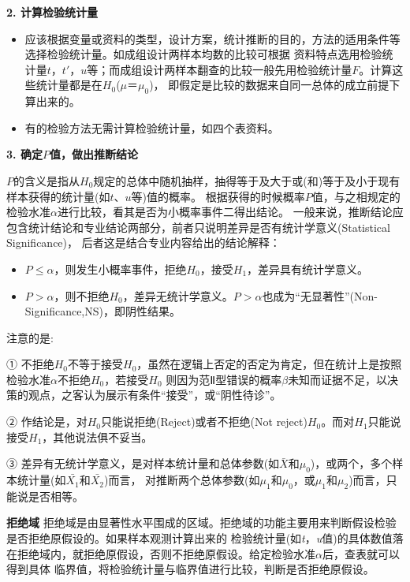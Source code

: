 \documentclass[
]{article}
\begin{document}
\textbf{2. 计算检验统计量}

\begin{itemize}
\item
  应该根据变量或资料的类型，设计方案，统计推断的目的，方法的适用条件等选择检验统计量。如成组设计两样本均数的比较可根据
  资料特点选用检验统计量\(t，t'，u\)等；而成组设计两样本翻查的比较一般先用检验统计量\(F\)。计算这些统计量都是在\(H_0\)(\(μ＝μ_0\))，
  即假定是比较的数据来自同一总体的成立前提下算出来的。
\item
  有的检验方法无需计算检验统计量，如四个表资料。
\end{itemize}

\textbf{3. 确定\(P\)值，做出推断结论}

\(P\)的含义是指从\(H_0\)规定的总体中随机抽样，抽得等于及大于或(和)等于及小于现有样本获得的统计量(如\(t\)、\(u\)等)值的概率。
根据获得的时候概率\(P\)值，与之相规定的检验水准\(\alpha\)进行比较，看其是否为小概率事件二得出结论。
一般来说，推断结论应包含统计结论和专业结论两部分，前者只说明差异是否有统计学意义(Statistical Significance)，
后者这是结合专业内容给出的结论解释：

\begin{itemize}
\item
  \(P\leq\alpha\)，则发生小概率事件，拒绝\(H_0\)，接受\(H_1\)，差异具有统计学意义。
\item
  \(P>\alpha\)，则不拒绝\(H_0\)，差异无统计学意义。\(P>\alpha\)也成为``无显著性''(Non-Significance,NS)，即阴性结果。
\end{itemize}

注意的是:

① 不拒绝\(H_0\)不等于接受\(H_0\)，虽然在逻辑上否定的否定为肯定，但在统计上是按照检验水准\(\alpha\)不拒绝\(H_0\)，若接受\(H_0\)
则因为范Ⅱ型错误的概率\(\beta\)未知而证据不足，以决策的观点，之客认为展示有条件``接受''，或``阴性待诊''。

② 作结论是，对\(H_0\)只能说拒绝(Reject)或者不拒绝(Not reject)\(H_0\)。而对\(H_1\)只能说接受\(H_1\)，其他说法俱不妥当。

③ 差异有无统计学意义，是对样本统计量和总体参数(如\(\bar{X}\)和\(μ_0\))，或两个，多个样本统计量(如\(\bar{X_1}\)和\(\bar{X_2}\))而言，
对推断两个总体参数(如\(μ_1\)和\(μ_0\)，或\(μ_1\)和\(μ_2\))而言，只能说是否相等。

\textbf{拒绝域}
拒绝域是由显著性水平围成的区域。拒绝域的功能主要用来判断假设检验是否拒绝原假设的。如果样本观测计算出来的
检验统计量(如\emph{t}，\emph{u}值)的具体数值落在拒绝域内，就拒绝原假设，否则不拒绝原假设。给定检验水准\(\alpha\)后，查表就可以得到具体
临界值，将检验统计量与临界值进行比较，判断是否拒绝原假设。
\end{document}
